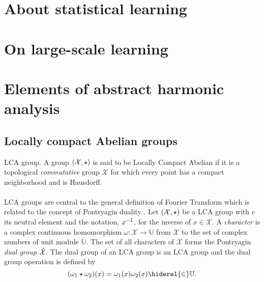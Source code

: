 \section{About statistical learning}
\label{sec:about_statistical_learning}

\section{On large-scale learning}
\label{sec:on_large-scale_learning}

\section{Elements of abstract harmonic analysis}
\label{sec:abstract_harmonic}

\subsection{Locally compact Abelian groups}
\begin{definition}{\acl{LCA} group.}
A group $(\mathcal{X}, \star)$ is said to be Locally Compact Abelian if it is a topological \emph{commutative} group $\mathcal{X}$ for which every point has a compact neighborhood and is Hausdorff. 
\end{definition}
\paragraph{}
\acf{LCA} groups are central to the general definition of Fourier Transform which is related to the concept of Pontryagin duality \citep{folland1994course}.
Let $(\mathcal{X}, \star)$ be a \acs{LCA} group with $e$ its neutral element and the notation, ${x}^{-1}$, for the inverse of $x \in \mathcal{X}$. A \emph{character} is a complex continuous homomorphism $\omega:\mathcal{X}\to\mathbb{U}$ from $\mathcal{X}$ to the set of complex numbers of unit module $\mathbb{U}$. The set of all characters of $\mathcal{X}$ forms the Pontryagin \emph{dual  group} $\hat{\mathcal{X}}$. The dual group of an \acs{LCA} group is an \acs{LCA} group and the dual group operation is defined by 
\begin{dmath*}
(\omega_1 \groupop \omega_2)(x)=\omega_1(x)\omega_2(x) \hiderel{\in} \mathbb{U}.
\end{dmath*}
